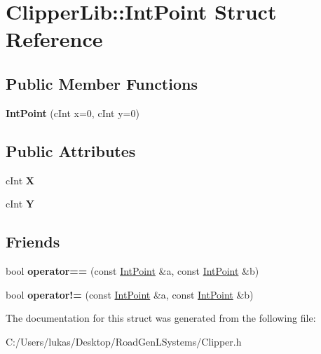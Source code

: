 \hypertarget{struct_clipper_lib_1_1_int_point}{}\section{Clipper\+Lib\+:\+:Int\+Point Struct Reference}
\label{struct_clipper_lib_1_1_int_point}
\subsection*{Public Member Functions}
\begin{DoxyCompactItemize}
\item 
\hypertarget{struct_clipper_lib_1_1_int_point_a819e71f9269e99f151a3a99c4283cd43}{}\label{struct_clipper_lib_1_1_int_point_a819e71f9269e99f151a3a99c4283cd43} 
{\bfseries Int\+Point} (c\+Int x=0, c\+Int y=0)
\end{DoxyCompactItemize}
\subsection*{Public Attributes}
\begin{DoxyCompactItemize}
\item 
\hypertarget{struct_clipper_lib_1_1_int_point_a608d16d39c8762e6c3c0a688efb310b6}{}\label{struct_clipper_lib_1_1_int_point_a608d16d39c8762e6c3c0a688efb310b6} 
c\+Int {\bfseries X}
\item 
\hypertarget{struct_clipper_lib_1_1_int_point_a8445d190cd9013bb34d49b5a8a240425}{}\label{struct_clipper_lib_1_1_int_point_a8445d190cd9013bb34d49b5a8a240425} 
c\+Int {\bfseries Y}
\end{DoxyCompactItemize}
\subsection*{Friends}
\begin{DoxyCompactItemize}
\item 
\hypertarget{struct_clipper_lib_1_1_int_point_a6afef09ee09723a387e3046287e2635b}{}\label{struct_clipper_lib_1_1_int_point_a6afef09ee09723a387e3046287e2635b} 
bool {\bfseries operator==} (const \hyperlink{struct_clipper_lib_1_1_int_point}{Int\+Point} \&a, const \hyperlink{struct_clipper_lib_1_1_int_point}{Int\+Point} \&b)
\item 
\hypertarget{struct_clipper_lib_1_1_int_point_aa37b2afb6cbc44cb9cd13ecc009decfb}{}\label{struct_clipper_lib_1_1_int_point_aa37b2afb6cbc44cb9cd13ecc009decfb} 
bool {\bfseries operator!=} (const \hyperlink{struct_clipper_lib_1_1_int_point}{Int\+Point} \&a, const \hyperlink{struct_clipper_lib_1_1_int_point}{Int\+Point} \&b)
\end{DoxyCompactItemize}


The documentation for this struct was generated from the following file\+:\begin{DoxyCompactItemize}
\item 
C\+:/\+Users/lukas/\+Desktop/\+Road\+Gen\+L\+Systems/Clipper.\+h\end{DoxyCompactItemize}
